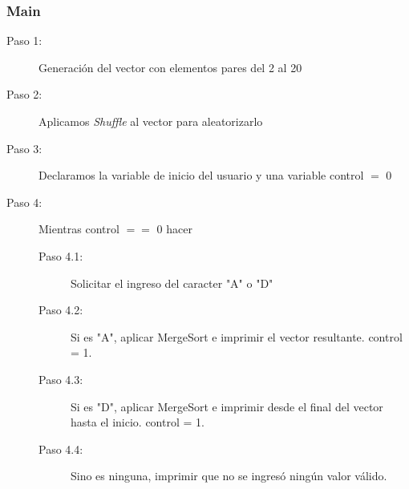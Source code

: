 \subsubsection{Main}
\begin{description}
	\item[Paso 1: ] Generación del vector con elementos pares del 2 al 20
	\item[Paso 2: ] Aplicamos \textit{Shuffle} al vector para aleatorizarlo
	\item[Paso 3: ] Declaramos la variable de inicio del usuario y una variable control $=$ 0
	\item[Paso 4: ] Mientras control $==$ 0 hacer
	\begin{description}
			\item[Paso 4.1: ] Solicitar el ingreso del caracter "A" o "D"
			\item[Paso 4.2: ] Si es "A", aplicar MergeSort e imprimir el vector resultante. control = 1.
			\item[Paso 4.3: ] Si es "D", aplicar MergeSort e imprimir desde el final del vector hasta el inicio. control = 1.
			\item[Paso 4.4: ] Sino es ninguna, imprimir que no se ingresó ningún valor válido.
		\end{description}
\end{description}


